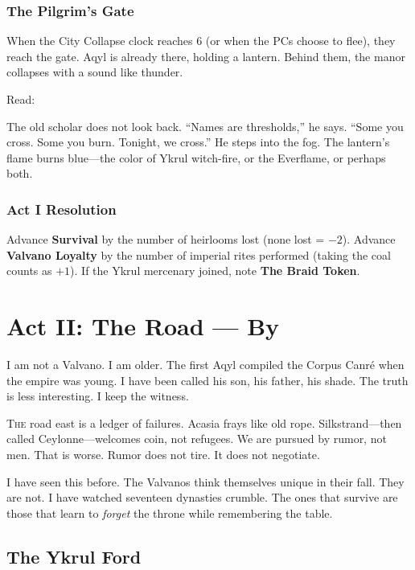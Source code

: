 \documentclass[11pt,a5paper]{book}
\begin{document}
\subsection*{The Pilgrim's Gate}

When the City Collapse clock reaches 6 (or when the PCs choose to flee), they reach the gate. Aqyl is already there, holding a lantern. Behind them, the manor collapses with a sound like thunder.

Read:
\begin{quoting}
The old scholar does not look back. ``Names are thresholds,'' he says. ``Some you cross. Some you burn. Tonight, we cross.'' He steps into the fog. The lantern's flame burns blue---the color of Ykrul witch-fire, or the Everflame, or perhaps both.
\end{quoting}

\subsection*{Act I Resolution}

Advance \textbf{Survival} by the number of heirlooms lost (none lost = $-2$). Advance \textbf{Valvano Loyalty} by the number of imperial rites performed (taking the coal counts as $+1$). If the Ykrul mercenary joined, note \textbf{The Braid Token}.

\clearpage

\chapter{Act II: The Road --- By \aqyl}

\epigraph{I am not a Valvano. I am older. The first Aqyl compiled the Corpus Canr\'e when the empire was young. I have been called his son, his father, his shade. The truth is less interesting. I keep the witness.}{\aqyl}

\lettrine{T}{he} road east is a ledger of failures. Acasia frays like old rope. Silkstrand---then called Ceylonne---welcomes coin, not refugees. We are pursued by rumor, not men. That is worse. Rumor does not tire. It does not negotiate.

I have seen this before. The Valvanos think themselves unique in their fall. They are not. I have watched seventeen dynasties crumble. The ones that survive are those that learn to \textit{forget} the throne while remembering the table.

\section*{The Ykrul Ford}
\end{document}

